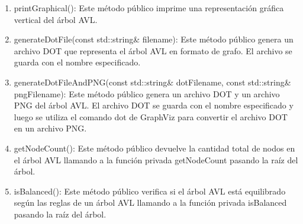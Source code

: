 \documentclass[]{article}
\begin{document}
\begin{enumerate}
    \item printGraphical(): Este método público imprime una representación gráfica vertical del árbol AVL.
    \item generateDotFile(const std::string\& filename): Este método público genera un archivo DOT que representa el árbol AVL en formato de grafo. El archivo se guarda con el nombre especificado.
    \item generateDotFileAndPNG(const std::string\& dotFilename, const std::string\& pngFilename): Este método público genera un archivo DOT y un archivo PNG del árbol AVL. El archivo DOT se guarda con el nombre especificado y luego se utiliza el comando dot de GraphViz para convertir el archivo DOT en un archivo PNG.
    \item getNodeCount(): Este método público devuelve la cantidad total de nodos en el árbol AVL llamando a la función privada getNodeCount pasando la raíz del árbol.
    \item isBalanced(): Este método público verifica si el árbol AVL está equilibrado según las reglas de un árbol AVL llamando a la función privada isBalanced pasando la raíz del árbol.
\end{enumerate}
\end{document}
